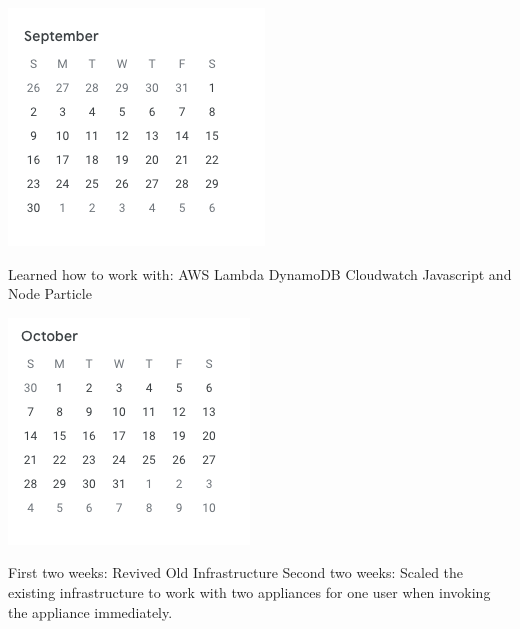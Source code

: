 \documentclass{beamer}
\begin{document}
\begin{frame}
    \includegraphics[width=0.5\paperwidth,height=0.5\paperheight,keepaspectratio]{pictures/september}

    \begin{outline}
         Learned how to work with:
         AWS
         Lambda
         DynamoDB
         Cloudwatch
         Javascript and Node
         Particle
    \end{outline}
\end{frame}

\begin{frame}
    \includegraphics[width=0.5\paperwidth,height=0.5\paperheight,keepaspectratio]{pictures/october}
    \begin{outline}
         First two weeks:
         Revived Old Infrastructure
         Second two weeks:
         Scaled the existing infrastructure to work with two appliances for one user
        when invoking the appliance immediately.
    \end{outline}
\end{frame}
\end{document}
